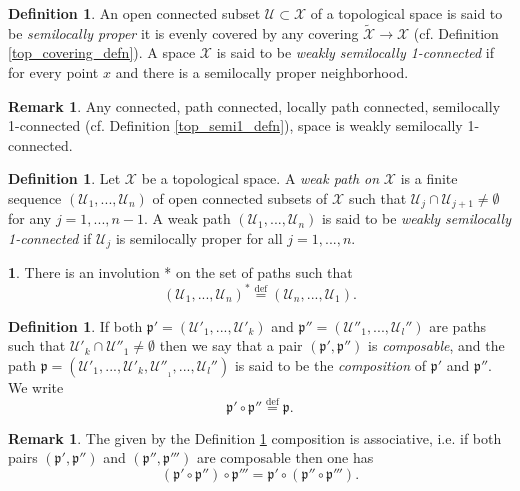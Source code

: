 \documentclass[10]{article}
\theoremstyle{plain}
\theoremstyle{definition}
\newtheorem{defn}[prop]{Definition}%
\newtheorem{empt}[prop]{}%
\theoremstyle{definition}
\newtheorem{definition}[prop]{Definition}
\newtheorem{remark}[prop]{Remark}
\numberwithin{equation}{section}
\newcommand{\7}{\dagger}                     %
\newcommand{\8}{\bullet}                     %
\renewcommand{\.}{\cdot}                     %
\renewcommand{\:}{\colon}                    %
\newcommand{\sU}{\mathcal{U}}       %
\newcommand{\sX}{\mathcal{X}}       %
\newcommand{\bydef}{\stackrel{\mathrm{def}}{=}}          %
\renewcommand{\:}{\colon}           %
\def\ee_#1{e_{{\scriptscriptstyle#1}}}       %
\newcommand{\be}{\begin{equation}}
\renewcommand{\ee}{\end{equation}}
\begin{document}
		\begin{defn}\label{top_weakly_semi1_defn}\cite{spanier:at}
			An open connected subset $\sU\subset \sX$ of a topological space is said to be \textit{semilocally proper} it is evenly covered by any covering $\widetilde{\sX}\to\sX$ (cf. Definition \ref{top_covering_defn}).
			A space $\sX$ is said to be \textit{weakly semilocally 1-connected} if for  every point $x$ and there is a semilocally proper neighborhood.
		\end{defn} 
		\begin{remark}
			Any connected, path connected, locally path connected, semilocally 1-connected (cf. Definition \ref{top_semi1_defn}),  space is weakly semilocally 1-connected.
		\end{remark}
		\begin{definition}\label{top_weak_path_defn}
			Let $\sX$ be a topological space.	A \textit{weak path on} $\sX$ is a finite sequence $\left(\sU_1, ..., \sU_n\right)$ of open  connected subsets of $\sX$ such that $\sU_j \cap \sU_{j+1} \neq \emptyset$ for any $j = 1, ..., n - 1$. A weak path $\left(\sU_1, ..., \sU_n\right)$ is said to be \textit{weakly semilocally 1-connected} if $\sU_j$ is semilocally proper for all $j = 1,..., n$.
		\end{definition}
		\begin{empt}\label{top_path_inv_empt}
			There is an involution * on the set of paths such that
			\be\label{top_path_inv_eqn}
			\left(\sU_{1},...,\sU_{n}\right)^*\bydef \left(\sU_{n},...,\sU_{1}\right).
			\ee
		\end{empt}
		\begin{definition}\label{top_path_comp_defn}
			If both $\mathfrak p'=\left(\sU'_{1},...,\sU'_{k}\right)$ and $\mathfrak p''=\left(\sU''_{1},...,\sU_{l}''\right)$ are paths such that $\sU'_{k} \cap \sU''_{1}\neq\emptyset$ then we say that a pair $\left( \mathfrak p', \mathfrak p''\right)$ is \textit{composable}, and the path $\mathfrak p=\left(\sU'_{1},...,\sU'_{k},\sU''_{_1},...,\sU_{l}'' \right)$  is said to be the \textit{composition} of $\mathfrak p'$ and $\mathfrak p''$. We write
			\be\label{top_path_comp_eqn}
			\mathfrak p'\circ \mathfrak p''\bydef\mathfrak p.
			\ee
		\end{definition}
		\begin{remark}\label{top_path_ass_rem}
			The given by the Definition \ref{top_path_comp_defn} composition is associative, i.e.  if both pairs $\left( \mathfrak p', \mathfrak p''\right)$ and $\left( \mathfrak p'', \mathfrak p'''\right)$ are composable then one has
			\be\label{top_path_ass_eqn}
			\left( \mathfrak p'\circ \mathfrak p''\right)  \circ \mathfrak p''' = \mathfrak p'\circ \left( \mathfrak p'' \circ \mathfrak p'''\right) .
			\ee 
		\end{remark}
		
\end{document}
